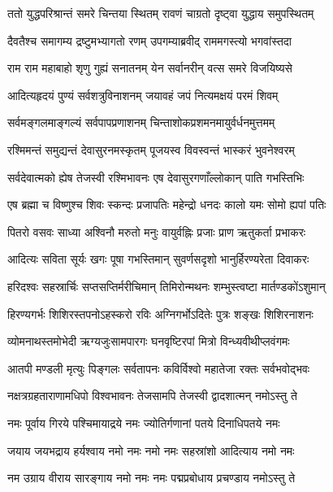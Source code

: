
\twolineshloka
{ततो युद्धपरिश्रान्तं समरे चिन्तया स्थितम्}
{रावणं चाग्रतो दृष्ट्वा युद्धाय समुपस्थितम्} %

\twolineshloka
{दैवतैश्च समागम्य द्रष्टुमभ्यागतो रणम्}
{उपगम्याब्रवीद् राममगस्त्यो भगवांस्तदा} %

\twolineshloka
{राम राम महाबाहो शृणु गुह्यं सनातनम्}
{येन सर्वानरीन् वत्स समरे विजयिष्यसे} %

\twolineshloka
{आदित्यहृदयं पुण्यं सर्वशत्रुविनाशनम्}
{जयावहं जपं नित्यमक्षयं परमं शिवम्} %

\twolineshloka
{सर्वमङ्गलमाङ्गल्यं सर्वपापप्रणाशनम्}
{चिन्ताशोकप्रशमनमायुर्वर्धनमुत्तमम्} %

\twolineshloka
{रश्मिमन्तं समुद्यन्तं देवासुरनमस्कृतम्}
{पूजयस्व विवस्वन्तं भास्करं भुवनेश्वरम्} %

\twolineshloka
{सर्वदेवात्मको ह्येष तेजस्वी रश्मिभावनः}
{एष देवासुरगणाँल्लोकान् पाति गभस्तिभिः} %

\twolineshloka
{एष ब्रह्मा च विष्णुश्च शिवः स्कन्दः प्रजापतिः}
{महेन्द्रो धनदः कालो यमः सोमो ह्यपां पतिः} %

\twolineshloka
{पितरो वसवः साध्या अश्विनौ मरुतो मनुः}
{वायुर्वह्निः प्रजाः प्राण ऋतुकर्ता प्रभाकरः} %

\twolineshloka
{आदित्यः सविता सूर्यः खगः पूषा गभस्तिमान्}
{सुवर्णसदृशो भानुर्हिरण्यरेता दिवाकरः} %

\twolineshloka
{हरिदश्वः सहस्रार्चिः सप्तसप्तिर्मरीचिमान्}
{तिमिरोन्मथनः शम्भुस्त्वष्टा मार्तण्डकोंऽशुमान्} %

\twolineshloka
{हिरण्यगर्भः शिशिरस्तपनोऽहस्करो रविः}
{अग्निगर्भोऽदितेः पुत्रः शङ्खः शिशिरनाशनः} %

\twolineshloka
{व्योमनाथस्तमोभेदी ऋग्यजुःसामपारगः}
{घनवृष्टिरपां मित्रो विन्ध्यवीथीप्लवंगमः} %

\twolineshloka
{आतपी मण्डली मृत्युः पिङ्गलः सर्वतापनः}
{कविर्विश्वो महातेजा रक्तः सर्वभवोद्भवः} %

\twolineshloka
{नक्षत्रग्रहताराणामधिपो विश्वभावनः}
{तेजसामपि तेजस्वी द्वादशात्मन् नमोऽस्तु ते} %

\twolineshloka
{नमः पूर्वाय गिरये पश्चिमायाद्रये नमः}
{ज्योतिर्गणानां पतये दिनाधिपतये नमः} %

\twolineshloka
{जयाय जयभद्राय हर्यश्वाय नमो नमः}
{नमो नमः सहस्रांशो आदित्याय नमो नमः} %

\twolineshloka
{नम उग्राय वीराय सारङ्गाय नमो नमः}
{नमः पद्मप्रबोधाय प्रचण्डाय नमोऽस्तु ते} %


